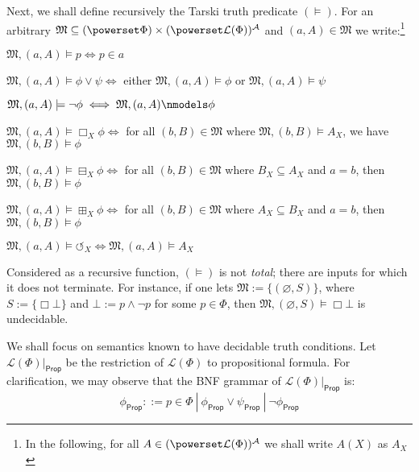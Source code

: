 \documentclass[11pt]{article}
\numberwithin{equation}{subsection}
\newcommand{\Nec}{\Box}
\newcommand{\BB}{\boxminus}
\newcommand{\BBI}{\boxplus}
\begin{document}
Next, we shall define recursively the Tarski truth predicate $(\models)$.  For an arbitrary $\mathfrak{M} \subseteq (\powerset \Phi) \times (\powerset \mathcal{L}(\Phi))^\mathcal{A}$ and $(a,A) \in \mathfrak{M}$ we write:\footnote{In the following, for all $A \in (\powerset \mathcal{L}(\Phi))^\mathcal{A}$ we shall write $A(X)$ as $A_X$}
\begin{peano}
	\item $\mathfrak{M}, (a,A) \models p \iff p \in a$
	\item $\mathfrak{M}, (a,A) \models \phi \vee \psi \iff$ either $\mathfrak{M}, (a,A) \models \phi$ or $\mathfrak{M}, (a,A) \models \psi$
	\item $\mathfrak{M}, (a,A) \models \neg \phi  \iff \mathfrak{M}, (a,A) \nmodels \phi$
	\item $\mathfrak{M}, (a,A) \models \Box_X \phi  \iff $ for all $(b,B) \in \mathfrak{M}$ where $\mathfrak{M}, (b,B) \models A_X$, we have $\mathfrak{M}, (b,B) \models \phi$
	\item $\mathfrak{M}, (a,A) \models \BB_X \phi  \iff $ for all $(b,B) \in \mathfrak{M}$ where $B_X \subseteq A_X$ and $a = b$, then $\mathfrak{M}, (b,B) \models \phi$
	\item $\mathfrak{M}, (a,A) \models \BBI_X \phi  \iff $ for all $(b,B) \in \mathfrak{M}$ where $A_X \subseteq B_X$ and $a = b$, then $\mathfrak{M}, (b,B) \models \phi$
	\item $\mathfrak{M}, (a,A) \models \circlearrowleft_X  \iff \mathfrak{M}, (a,A) \models A_X$ 
\end{peano}

 Considered as a recursive function, $(\models)$ is not \emph{total}; there are inputs for which it does not terminate.  For instance, if one lets $\mathfrak{M} := \{(\varnothing,S)\}$, where $S := \{ \Nec \bot \}$ and $\bot := p \wedge \neg p$ for some $p \in \Phi$, then $\mathfrak{M}, (\varnothing,S) \models \Nec \bot$ is undecidable.

We shall focus on semantics known to have decidable truth conditions.  Let $\mathcal{L}(\Phi)|_{\mathsf{Prop}}$ be the restriction of $\mathcal{L}(\Phi)$ to propositional formula.  For clarification, we may observe that the BNF grammar of $\mathcal{L}(\Phi)|_{\mathsf{Prop}}$ is:
$$\phi_{\mathsf{Prop}} ::= p \in \Phi \ |\ \phi_{\mathsf{Prop}} \vee \psi_{\mathsf{Prop}} \ | \ \neg \phi_{\mathsf{Prop}}$$
\end{document}
